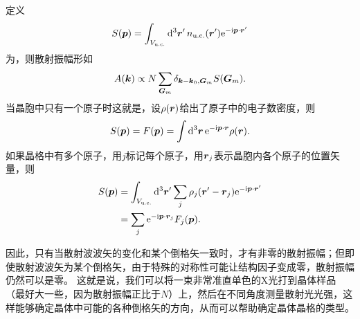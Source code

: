 定义
\begin{equation}
    S(\vb*{p}) = \int_{V_{\text{u.c.}}} \dd[3]{\vb*{r}'} n_\text{u.c.}(\vb*{r}') \mathrm{e}^{-\mathrm{i} \vb*{p} \cdot \vb*{r}'}
\end{equation}
为，则散射振幅形如
\begin{equation}
    A(\vb*{k}) \propto N \sum_{\vb*{G}_m} \delta_{\vb*{k} - \vb*{k}_0, \vb*{G}_m} S(\vb*{G}_m).
\end{equation}
当晶胞中只有一个原子时这就是，设$\rho(\vb*{r})$给出了原子中的电子数密度，则
\begin{equation}
    S(\vb*{p}) = F(\vb*{p}) = \int \dd[3]{\vb*{r}} \mathrm{e}^{-\mathrm{i} \vb*{p} \cdot \vb*{r}} \rho(\vb*{r}).
\end{equation}
如果晶格中有多个原子，用$j$标记每个原子，用$\vb*{r}_j$表示晶胞内各个原子的位置矢量，则
\begin{equation}
    \begin{aligned}
        S(\vb*{p}) &= \int_{V_{\text{u.c.}}} \dd[3]{\vb*{r}'} \sum_j \rho_j(\vb*{r}' - \vb*{r}_j) \mathrm{e}^{-\mathrm{i} \vb*{p} \cdot \vb*{r}'} \\
        &= \sum_j \mathrm{e}^{-\mathrm{i} \vb*{p} \cdot \vb*{r}_j} F_j(\vb*{p}).
    \end{aligned}
\end{equation}

因此，只有当散射波波矢的变化和某个倒格矢一致时，才有非零的散射振幅；但即使散射波波矢为某个倒格矢，由于特殊的对称性可能让结构因子变成零，散射振幅仍然可以是零。
这就是说，我们可以将一束非常准直单色的X光打到晶体样品（最好大一些，因为散射振幅正比于$N$）上，然后在不同角度测量散射光光强，这样能够确定晶体中可能的各种倒格矢的方向，从而可以帮助确定晶体晶格的类型。